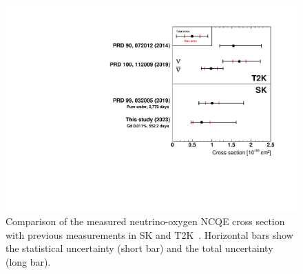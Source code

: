 \begin{figure}[p]
	\centering
	\includegraphics[width=12cm]{PDF/PreviousStudy/PreviousStudy_02}
	\caption[Comparison of the measured neutrino-oxygen NCQE cross section with previous measurements in SK and T2K]{
	Comparison of the measured neutrino-oxygen NCQE cross section with previous measurements in SK and T2K~\cite{2014Abe,2019Abe,2019Linyan}.
	Horizontal bars show the statistical uncertainty (short bar) and the total uncertainty (long bar).
	}\label{PreviousStudy_02}
\end{figure}





\newpage


